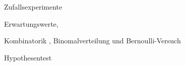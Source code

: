 


\begin{inhalt}
	\item Zufallsexperimente 
	\item Erwartungswerte,
	\item Kombinatorik , Binomalverteilung und Bernoulli-Versuch 
	\item Hypothesentest 
\end{inhalt}




